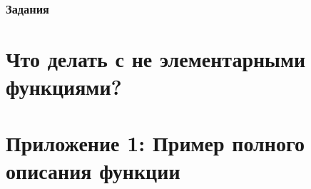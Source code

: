 \documentclass[12pt,a4paper]{scrartcl}
\begin{document}
\subsubsection{Задания}


\newpage
\section{Что делать с не элементарными функциями?}


\newpage
\section*{Приложение 1: Пример полного описания функции} \label{full}

\end{document}
